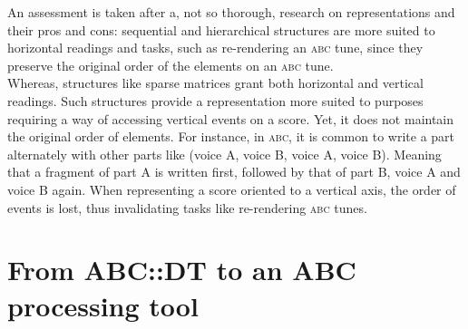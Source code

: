 \documentclass[a4paper,UKenglish]{oasics}
\newcommand{\abc}{\textsc{abc}}
\newcommand{\abcdt}{\textsc{abc::dt}}
\newcommand{\abcprocessor}{\emph{abc\_processor}}
\newcommand{\awk}{\texttt{awk} }
\begin{document}
    An assessment is taken after a, not so thorough, research on representations and their pros and
    cons: sequential and hierarchical structures are more suited to horizontal readings and tasks,
    such as re-rendering an \abc{}  tune, since they preserve the original order of the elements on
    an \abc{} tune.\\
    Whereas, structures like sparse matrices grant both horizontal and vertical readings. Such
    structures provide a representation more suited to purposes requiring a way of accessing
    vertical events on a score. Yet, it does not maintain the original order of elements. For
    instance, in \abc, it is common to write a part alternately with other parts like (voice A,
    voice B, voice A, voice B). Meaning that a fragment of part A is written first, followed by that
    of part B, voice A and voice B again. When representing a score oriented to a vertical axis, the
    order of events is lost, thus invalidating tasks like re-rendering \abc{} tunes.%
% 

\section{From ABC::DT to an ABC processing tool}
\label{sec:abc_dt}

% 
% 
% 
\end{document}
